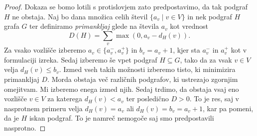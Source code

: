 \documentclass[12pt,a4paper,twoside]{article}
\theoremstyle{definition} %
\theoremstyle{plain} %
\numberwithin{equation}{section}  %
\begin{document}
\begin{proof}
Dokaza se bomo lotili s protislovjem zato predpostavimo, da tak podgraf $H$ ne obstaja. Naj bo dana množica celih števil $\{ a_v  \mid v \in V\}$ in nek podgraf $H$ grafa $G$ ter definiramo \textit{primankljaj} glede na števila $a_v$ kot vrednost
$$D(H)= \sum_v \max(0, a_v - d_H(v)) .$$ 
Za vsako vozlišče izberemo $a_v \in \{a_v^-, a_v^+\}$ in $b_v = a_v +1$, kjer sta $a_v^-$ in $a_v^+$ kot v formulaciji izreka. Sedaj izberemo še vpet podgraf $H \subseteq G$, tako da za vsak $v \in V$ velja $d_H(v) \le b_v$. Izmed vseh takih možnosti izberemo tisto, ki minimizira primankljaj $D$. Morda obstaja več različnih podgrafov, ki ustrezajo zgornjim omejitvam. Mi izberemo enega izmed njih.  Sedaj trdimo, da obstaja vsaj eno vozlišče $v \in V$ za katerega $d_H(v) < a_v$ ter posledično $D > 0$. To je res, saj v nasprotnem primeru  velja $d_H(v) = a_v$ ali $d_H(v) = b_v = a_v + 1$, kar pa pomeni, da je $H$ iskan podgraf. To je namreč nemogoče saj smo predpostavili nasprotno.


\end{proof}
\end{document}
